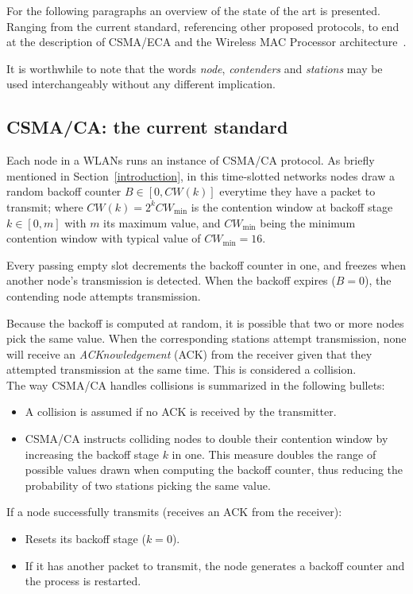 For the following paragraphs an overview of the state of the art is presented. Ranging from the current standard, referencing other proposed protocols, to end at the description of CSMA/ECA and the Wireless MAC Processor architecture~\cite{WMP}.

It is worthwhile to note that the words \emph{node}, \emph{contenders} and \emph{stations} may be used interchangeably without any different implication.

\subsection{CSMA/CA: the current standard}
Each node in a WLANs runs an instance of CSMA/CA protocol. As briefly mentioned in Section~\ref{introduction}, in this time-slotted networks nodes draw a random backoff counter $B\in[0,CW(k)]$ everytime they have a packet to transmit; where $CW(k)=2^{k}CW_{\min}$ is the contention window at backoff stage $k\in[0,m]$ with $m$ its maximum value, and $CW_{\min}$ being the minimum contention window with typical value of $CW_{\min}=16$.

Every passing empty slot decrements the backoff counter in one, and freezes when another node's transmission is detected. When the backoff expires ($B=0$), the contending node attempts transmission.

Because the backoff is computed at random, it is possible that two or more nodes pick the same value. When the corresponding stations attempt transmission, none will receive an \emph{ACKnowledgement} (ACK) from the receiver given that they attempted transmission at the same time. This is considered a collision.\\

The way CSMA/CA handles collisions is summarized in the following bullets:
\begin{itemize}
	\item A collision is assumed if no ACK is received by the transmitter.
	\item CSMA/CA instructs colliding nodes to double their contention window by increasing the backoff stage $k$ in one. This measure doubles the range of possible values drawn when computing the backoff counter, thus reducing the probability of two stations picking the same value.
\end{itemize}

If a node successfully transmits (receives an ACK from the receiver):
\begin{itemize}
	\item Resets its backoff stage ($k=0$).
	\item If it has another packet to transmit, the node generates a backoff counter and the process is restarted.
\end{itemize}

